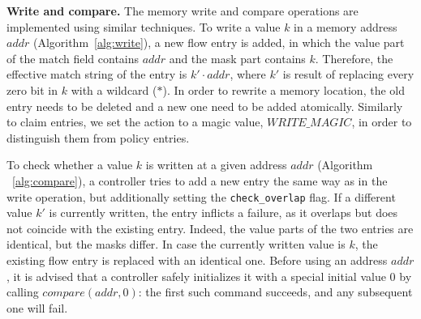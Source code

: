 \documentclass{sig-alternate-2006}
\newcommand{\concat}[0]{\cdot}
\newcommand{\compare}{compare\xspace}
\newcommand{\memwrite}{write\xspace}
\newcommand{\addr}{\textit{addr}\xspace}
\newcommand{\checko}{\texttt{check\_overlap}\xspace}
\newcommand{\liron}[1]{\textit{\textcolor{mypurple}{[liron]: #1}}} %
\newcommand{\petr}[1]{\textit{\textcolor{blue}{[petr]: #1}}} %
\newcommand{\memmagic}{\textit{WRITE\_MAGIC}}
\begin{document}
\vspace{1mm}
\noindent\textbf{Write and compare.}
The memory \memwrite and \compare
 operations are implemented using similar techniques.
To write a value $k$ in a memory address $\addr$ (Algorithm~\ref{alg:write}), a new flow entry is
added, in which the value part of the match field contains $\addr$ and
the mask part contains $k$. 
Therefore, the effective match string of the entry 
 is $k'\concat \addr$, where $k'$ is result of replacing every zero bit in $k$ with a wildcard ($*$).
  In order to rewrite a memory location, the old entry needs to be deleted and a new one need to be added atomically.
Similarly to claim entries, we set the action to a magic value,
$\memmagic$, in order to distinguish them from policy entries.

To check whether a value $k$ is written at a given
address $\addr$ (Algorithm ~\ref{alg:compare}),
a controller tries to add a new entry the same way as in the \memwrite operation,
but additionally setting the \texttt{\checko} flag. 
If a different value $k'$ is currently written, 
the entry inflicts a failure, as it overlaps but does not coincide
with the existing entry.
Indeed, the value parts of the two entries are identical, but the
masks differ.
In case the currently written value is $k$, the existing flow entry is replaced
with an identical one.
Before using an address $\addr$, it is advised that a controller safely
initializes it with a special initial value $0$ by calling
$\textit{\compare}(\addr,0)$: 
the first such command succeeds, and any 
subsequent one will fail. 


\end{document}
